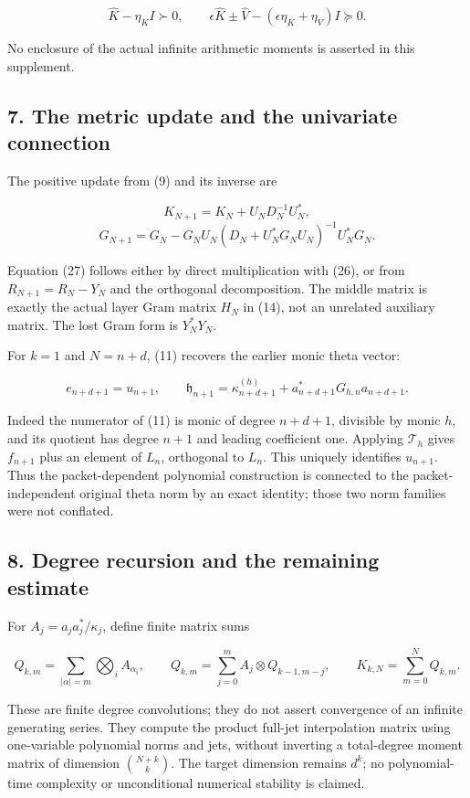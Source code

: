 \documentclass[
]{article}
\begin{document}
\[
\widehat K-\eta_KI\succ0,\qquad
\epsilon\widehat K\pm\widehat V
-(\epsilon\eta_K+\eta_V)I\succeq0.
\tag{25}
\]

No enclosure of the actual infinite arithmetic moments is asserted in
this supplement.

\subsection{7. The metric update and the univariate
connection}\label{the-metric-update-and-the-univariate-connection}

The positive update from (9) and its inverse are

\[
\boxed{K_{N+1}=K_N+U_ND_N^{-1}U_N^*,}
\tag{26}
\] \[
\boxed{G_{N+1}=G_N-G_NU_N(D_N+U_N^*G_NU_N)^{-1}U_N^*G_N.}
\tag{27}
\]

Equation (27) follows either by direct multiplication with (26), or from
\(R_{N+1}=R_N-Y_N\) and the orthogonal decomposition. The middle matrix
is exactly the actual layer Gram matrix \(H_N\) in (14), not an
unrelated auxiliary matrix. The lost Gram form is \(Y_N^*Y_N\).

For \(k=1\) and \(N=n+d\), (11) recovers the earlier monic theta vector:

\[
\boxed{e_{n+d+1}=u_{n+1},\qquad
\mathfrak h_{n+1}=\kappa_{n+d+1}^{(h)}
+a_{n+d+1}^*G_{h,n}a_{n+d+1}.}
\tag{28}
\]

Indeed the numerator of (11) is monic of degree \(n+d+1\), divisible by
monic \(h\), and its quotient has degree \(n+1\) and leading coefficient
one. Applying \(\mathcal T_h\) gives \(f_{n+1}\) plus an element of
\(L_n\), orthogonal to \(L_n\). This uniquely identifies \(u_{n+1}\).
Thus the packet-dependent polynomial construction is connected to the
packet-independent original theta norm by an exact identity; those two
norm families were not conflated.

\subsection{8. Degree recursion and the remaining
estimate}\label{degree-recursion-and-the-remaining-estimate}

For \(A_j=a_ja_j^*/\kappa_j\), define finite matrix sums

\[
Q_{k,m}=\sum_{|\alpha|=m}\bigotimes_i A_{\alpha_i},\qquad
Q_{k,m}=\sum_{j=0}^m A_j\otimes Q_{k-1,m-j},\qquad
K_{k,N}=\sum_{m=0}^NQ_{k,m}.
\tag{29}
\]

These are finite degree convolutions; they do not assert convergence of
an infinite generating series. They compute the product full-jet
interpolation matrix using one-variable polynomial norms and jets,
without inverting a total-degree moment matrix of dimension
\(\binom{N+k}{k}\). The target dimension remains \(d^k\); no
polynomial-time complexity or unconditional numerical stability is
claimed.
\end{document}
